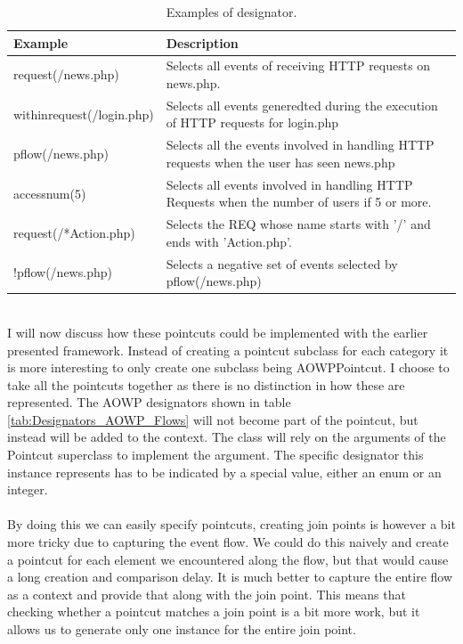\documentclass[a4paper]{report}
\begin{document}
\begin{table}[h!]
\centering
\begin{tabular}{l|p{7cm}}
\hline
Example & Description\\
\hline
\hline
request(/news.php) & Selects all events of receiving HTTP requests on news.php.\\
\hline
withinrequest(/login.php) & Selects all events generedted during the execution of HTTP requests for login.php\\
\hline
pflow(/news.php) & Selects all the events involved in handling HTTP requests when the user has seen news.php\\
\hline
accessnum(5) & Selects all events involved in handling HTTP Requests when the number of users if 5 or more.\\
\hline
request(/*Action.php) & Selects the REQ whose name starts with '/' and ends with 'Action.php'.\\
\hline
!pflow(/news.php) & Selects a negative set of events selected by pflow(/news.php)\\
\hline
\end{tabular}
\caption{Examples of designator.}
\label{tab:Designators_AOWP_Pointcut}
\end{table}
\\
I will now discuss how these pointcuts could be implemented with the earlier presented framework. Instead of creating a pointcut subclass for each category it is more interesting to only create one subclass being AOWPPointcut. I choose to take all the pointcuts together as there is no distinction in how these are represented. The AOWP designators shown in table \ref{tab:Designators_AOWP_Flows} will not become part of the pointcut, but instead will be added to the context. The class will rely on the arguments of the Pointcut superclass to implement the argument. The specific designator this instance represents has to be indicated by a special value, either an enum or an integer. \\
\\
By doing this we can easily specify pointcuts, creating join points is however a bit more tricky due to capturing the event flow. We could do this naively and create a pointcut for each element we encountered along the flow, but that would cause a long creation and comparison delay. It is much better to capture the entire flow as a context and provide that along with the join point. This means that checking whether a pointcut matches a join point is a bit more work, but it allows us to generate only one instance for the entire join point.\\
\end{document}
